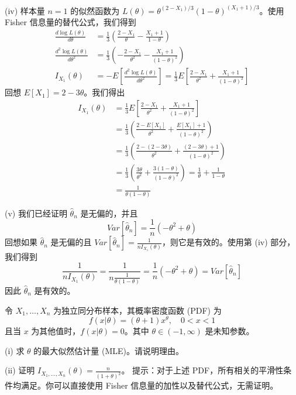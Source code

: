 \begin{questions}
\begin{solution}
(iv) 样本量 $n = 1$ 的似然函数为 $L(\theta) = \theta^{(2-X_1)/3}(1 - \theta)^{(X_1+1)/3}$。使用 Fisher 信息量的替代公式，我们得到
\begin{align*}
\frac{d \log L(\theta)}{d\theta} &= \frac{1}{3} \left(\frac{2 - X_1}{\theta} - \frac{X_1 + 1}{1 - \theta}\right)\\
\frac{d^2 \log L(\theta)}{d\theta^2} &= \frac{1}{3} \left(-\frac{2 - X_1}{\theta^2} - \frac{X_1 + 1}{(1 - \theta)^2}\right)\\
I_{X_1}(\theta) &= -E\left[\frac{d^2 \log L(\theta)}{d\theta^2}\right] = \frac{1}{3} E\left[\frac{2 - X_1}{\theta^2} + \frac{X_1 + 1}{(1 - \theta)^2}\right]
\end{align*}
回想 $E[X_1] = 2 - 3\theta$。我们得出
\begin{align*}
I_{X_1}(\theta) &= \frac{1}{3} E\left[\frac{2 - X_1}{\theta^2} + \frac{X_1 + 1}{(1 - \theta)^2}\right]\\
&= \frac{1}{3} \left(\frac{2 - E[X_1]}{\theta^2} + \frac{E[X_1] + 1}{(1 - \theta)^2}\right)\\
&= \frac{1}{3} \left(\frac{2 - (2 - 3\theta)}{\theta^2} + \frac{(2 - 3\theta) + 1}{(1 - \theta)^2}\right)\\
&= \frac{1}{3} \left(\frac{3\theta}{\theta^2} + \frac{3(1 - \theta)}{(1 - \theta)^2}\right) = \frac{1}{\theta} + \frac{1}{1 - \theta}\\
&= \frac{1}{\theta(1 - \theta)}
\end{align*}

(v) 我们已经证明 $\hat{\theta}_n$ 是无偏的，并且
\[
Var[\hat{\theta}_n] = \frac{1}{n}(-\theta^2 + \theta)
\]
回想如果 $\hat{\theta}_n$ 是无偏的且 $Var[\hat{\theta}_n] = \frac{1}{n I_{X_1}(\theta)}$，则它是有效的。使用第 (iv) 部分，我们得到
\[
\frac{1}{n I_{X_1}(\theta)} = \frac{1}{n \frac{1}{\theta(1 - \theta)}} = \frac{1}{n}(-\theta^2 + \theta) = Var[\hat{\theta}_n]
\]
因此 $\hat{\theta}_n$ 是有效的。
\end{solution}

\question
令 $X_1, \dots, X_n$ 为独立同分布样本，其概率密度函数 (PDF) 为
\[
f(x|\theta) = (\theta + 1)x^\theta, \quad 0 < x < 1
\]
且当 $x$ 为其他值时，$f(x|\theta) = 0$。其中 $\theta \in (-1, \infty)$ 是未知参数。

(i) 求 $\theta$ 的最大似然估计量 (MLE)。请说明理由。

(ii) 证明 $I_{X_1, \dots, X_n}(\theta) = \frac{n}{(1 + \theta)^2}$。
提示：对于上述 PDF，所有相关的平滑性条件均满足。你可以直接使用 Fisher 信息量的加性以及替代公式，无需证明。


\end{questions}
